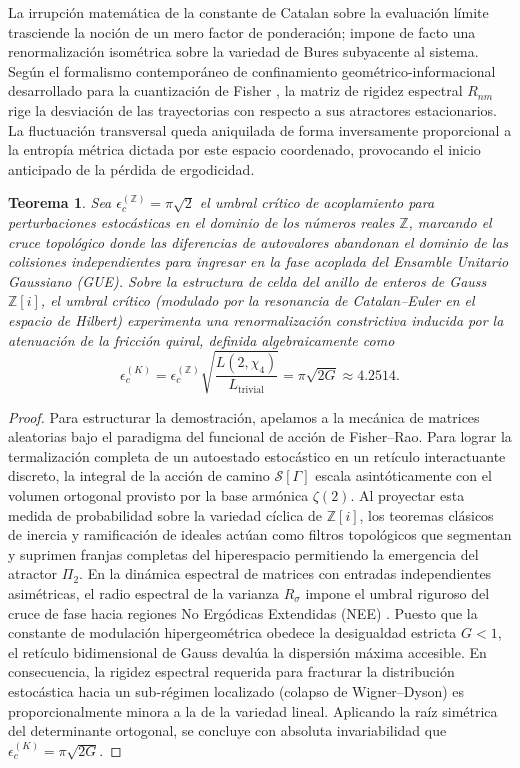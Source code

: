 \documentclass{article}
\numberwithin{equation}{section}
\theoremstyle{plain}
\newtheorem{teorema}{Teorema}[section]
\theoremstyle{definition}
\begin{document}
La irrupción matemática de la constante de Catalan sobre la evaluación límite trasciende la noción de un mero factor de ponderación; impone de facto una renormalización isométrica sobre la variedad de Bures subyacente al sistema. Según el formalismo contemporáneo de confinamiento geométrico-informacional desarrollado para la cuantización de Fisher \cite{BlumMerwin2026}, la matriz de rigidez espectral $R_{nm}$ rige la desviación de las trayectorias con respecto a sus atractores estacionarios. La fluctuación transversal queda aniquilada de forma inversamente proporcional a la entropía métrica dictada por este espacio coordenado, provocando el inicio anticipado de la pérdida de ergodicidad.

\begin{teorema}
\label{teo:acoplamiento_catalan_formal}
Sea $\epsilon_c^{(\mathbb{Z})} = \pi\sqrt{2}$ el umbral crítico de acoplamiento para perturbaciones estocásticas en el dominio de los números reales $\mathbb{Z}$, marcando el cruce topológico donde las diferencias de autovalores abandonan el dominio de las colisiones independientes para ingresar en la fase acoplada del Ensamble Unitario Gaussiano (GUE). Sobre la estructura de celda del anillo de enteros de Gauss $\mathbb{Z}[i]$, el umbral crítico (modulado por la resonancia de Catalan--Euler en el espacio de Hilbert) experimenta una renormalización constrictiva inducida por la atenuación de la fricción quiral, definida algebraicamente como
\begin{equation}
    \epsilon_c^{(K)} = \epsilon_c^{(\mathbb{Z})} \sqrt{\frac{L(2, \chi_4)}{L_{\text{trivial}}}} = \pi \sqrt{2G} \approx 4.2514.
\end{equation}
\end{teorema}

\begin{proof}
Para estructurar la demostración, apelamos a la mecánica de matrices aleatorias bajo el paradigma del funcional de acción de Fisher--Rao. Para lograr la termalización completa de un autoestado estocástico en un retículo interactuante discreto, la integral de la acción de camino $\mathcal{S}[\Gamma]$ escala asintóticamente con el volumen ortogonal provisto por la base armónica $\zeta(2)$. Al proyectar esta medida de probabilidad sobre la variedad cíclica de $\mathbb{Z}[i]$, los teoremas clásicos de inercia y ramificación de ideales actúan como filtros topológicos que segmentan y suprimen franjas completas del hiperespacio permitiendo la emergencia del atractor $\Pi_2$.
En la dinámica espectral de matrices con entradas independientes asimétricas, el radio espectral de la varianza $R_{\sigma}$ impone el umbral riguroso del cruce de fase hacia regiones No Ergódicas Extendidas (NEE) \cite{AltErdos2021}. Puesto que la constante de modulación hipergeométrica obedece la desigualdad estricta $G < 1$, el retículo bidimensional de Gauss devalúa la dispersión máxima accesible. En consecuencia, la rigidez espectral requerida para fracturar la distribución estocástica hacia un sub-régimen localizado (colapso de Wigner--Dyson) es proporcionalmente minora a la de la variedad lineal. Aplicando la raíz simétrica del determinante ortogonal, se concluye con absoluta invariabilidad que $\epsilon_c^{(K)} = \pi\sqrt{2G}$.
\end{proof}
\end{document}
